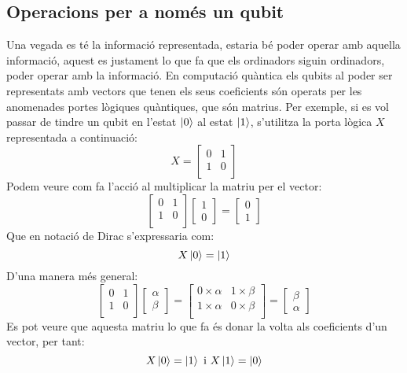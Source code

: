 \subsection{Operacions per a només un qubit}
Una vegada es té la informació representada, estaria bé poder operar amb aquella informació, aquest es justament lo que fa que els ordinadors siguin ordinadors, poder operar amb la informació. En computació quàntica els qubits al poder ser representats amb vectors que tenen els seus coeficients són operats per les anomenades portes lògiques quàntiques, que són matrius. Per exemple, si es vol passar de tindre un qubit en l'estat $\ket{0}$ al estat $\ket{1}$, s'utilitza la porta lògica $X$ representada a continuació:
$$
X = \begin{bmatrix}
	0 & 1\\
	1 & 0\\
\end{bmatrix}
$$ 
Podem veure com fa l'acció al multiplicar la matriu per el vector: 
$$
\begin{bmatrix} 0 & 1\\ 1 & 0\\ \end{bmatrix} \begin{bmatrix}1 \\ 0 \end{bmatrix} = \begin{bmatrix}0 \\ 1 \end{bmatrix}
$$
Que en notació de Dirac s'expressaria com: 
$$
X\ket{0} = \ket{1}
$$
D'una manera més general: 
$$
\begin{bmatrix} 0 & 1\\ 1 & 0\\ \end{bmatrix} \begin{bmatrix}\alpha \\ \beta \end{bmatrix} =
\begin{bmatrix} 0\times\alpha & 1\times\beta \\
				1\times\alpha & 0\times\beta \\
\end{bmatrix}
 = \begin{bmatrix} \beta \\ \alpha \end{bmatrix}
$$
Es pot veure que aquesta matriu lo que fa és donar la volta als coeficients d'un vector, per tant:
$$
X\ket{0} = \ket{1} \text{ i } X\ket{1} = \ket{0}
$$


